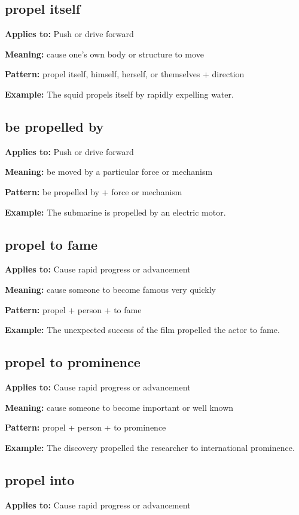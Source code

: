 \documentclass[11pt]{article}
\begin{document}
\subsection{propel itself}
\textbf{Applies to:} Push or drive forward

\textbf{Meaning:} cause one's own body or structure to move

\textbf{Pattern:} propel itself, himself, herself, or themselves + direction

\textbf{Example:} The squid propels itself by rapidly expelling water.

\subsection{be propelled by}
\textbf{Applies to:} Push or drive forward

\textbf{Meaning:} be moved by a particular force or mechanism

\textbf{Pattern:} be propelled by + force or mechanism

\textbf{Example:} The submarine is propelled by an electric motor.

\subsection{propel to fame}
\textbf{Applies to:} Cause rapid progress or advancement

\textbf{Meaning:} cause someone to become famous very quickly

\textbf{Pattern:} propel + person + to fame

\textbf{Example:} The unexpected success of the film propelled the actor to fame.

\subsection{propel to prominence}
\textbf{Applies to:} Cause rapid progress or advancement

\textbf{Meaning:} cause someone to become important or well known

\textbf{Pattern:} propel + person + to prominence

\textbf{Example:} The discovery propelled the researcher to international prominence.

\subsection{propel into}
\textbf{Applies to:} Cause rapid progress or advancement
\end{document}
